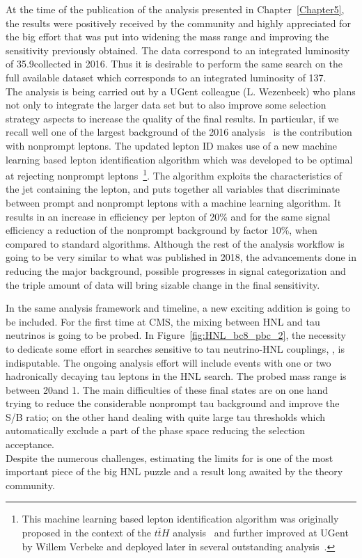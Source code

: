 At the time of the publication of the analysis presented in
Chapter~\ref{Chapter5}, the results were positively received by the community and highly appreciated
for the big effort that was put into widening the mass range and
improving the sensitivity previously obtained. The
data correspond to an integrated luminosity of 
35.9\fbinv collected in 2016. Thus it is desirable to perform the same
search on the full available dataset which corresponds to an integrated luminosity of 
137\fbinv. \\
The analysis is being carried out by a UGent colleague (L. Wezenbeek)
who plans not only to integrate the larger data set but to also improve
some selection strategy aspects to increase the quality of the final
results. In particular, if we recall well one of the largest
background of the 2016 analysis~\cite{Sirunyan:2018mtv} is the contribution with nonprompt
leptons. The updated lepton ID makes use of a new machine learning
based lepton identification algorithm which was developed to be
optimal at rejecting nonprompt leptons~\footnote{This machine learning
based lepton identification algorithm was originally proposed in the context of the $t\overline{t}H$ analysis~\cite{Sirunyan_2018_ttH} and further improved at UGent by Willem
Verbeke and deployed later in several outstanding analysis~\cite{CMS:2018sgc_tzq, Sirunyan_2021_higgsmumu}.}. The algorithm exploits the
characteristics of the jet containing the lepton, and puts together all
variables that discriminate between prompt and
nonprompt leptons with a machine learning algorithm. It results in an increase in efficiency
per lepton of 20\% and for the same signal
efficiency a reduction of the
nonprompt background
by factor 10\%, when compared to standard algorithms. Although the rest of the analysis workflow is going to be very
similar to what was published in 2018, the advancements done in reducing the
major background, possible progresses in signal categorization and the
triple amount of data will bring sizable change in the final
sensitivity.

In the same analysis framework and timeline, a new exciting addition
is going to be included. For the first time at CMS, the mixing between
HNL and tau neutrinos is going to be probed.
In Figure~\ref{fig:HNL_bc8_pbc_2}, the necessity to dedicate some effort in searches sensitive to tau neutrino-HNL couplings, \mixpart, is indisputable. The ongoing analysis effort will include events with one or two hadronically decaying tau leptons in the HNL search. The probed mass
range is between 20\GeV and 1\TeV. The main difficulties of these final
states are on one hand trying to reduce the considerable nonprompt tau background and
improve the S/B ratio; on the other hand dealing with quite large tau
\pt thresholds which automatically exclude a part of the phase space
reducing the selection acceptance. \\
Despite the numerous challenges, estimating the limits for \mixpart is
one of the most important piece of the big HNL puzzle and a result long awaited
by the theory community.  

